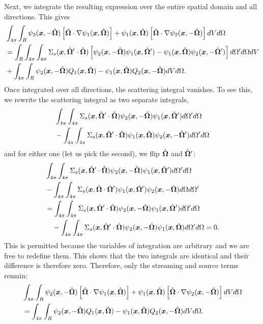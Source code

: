 Next, we integrate the resulting expression over the entire spatial domain and all directions. This gives
\begin{align}
  &\int_{4\pi} \int_R \psi_2(\bm{x},-\hat{\mathbf{\Omega}}) \left[ \hat{\mathbf{\Omega}} \cdot \nabla \psi_1(\bm{x},\hat{\mathbf{\Omega}}) \right] + \psi_1(\bm{x},\hat{\mathbf{\Omega}}) \left[ \hat{\mathbf{\Omega}} \cdot \nabla \psi_2(\bm{x},-\hat{\mathbf{\Omega}}) \right] dV d\Omega \nonumber \\*
  &= \int_R \int_{4\pi} \int_{4\pi} \Sigma_s(\bm{x},\hat{\mathbf{\Omega}}' \cdot \hat{\mathbf{\Omega}}) \left[ \psi_2(\bm{x},-\hat{\mathbf{\Omega}})  \psi_1(\bm{x},\hat{\mathbf{\Omega}}') -  \psi_1(\bm{x},\hat{\mathbf{\Omega}}) \psi_2(\bm{x},-\hat{\mathbf{\Omega}}') \right] d\Omega' d\Omega dV  \nonumber \\*
  &+ \int_{4\pi} \int_R  \psi_2(\bm{x},-\hat{\mathbf{\Omega}}) Q_1(\bm{x},\hat{\mathbf{\Omega}}) - \psi_1(\bm{x},\hat{\mathbf{\Omega}}) Q_2(\bm{x},-\hat{\mathbf{\Omega}}) dV d\Omega.
\end{align}
Once integrated over all directions, the scattering integral vanishes. To see this, we rewrite the scattering integral as two separate integrals,
\begin{align}
  &\int_{4\pi} \int_{4\pi} \Sigma_s(\bm{x},\hat{\mathbf{\Omega}}' \cdot \hat{\mathbf{\Omega}}) \psi_2(\bm{x},-\hat{\mathbf{\Omega}})  \psi_1(\bm{x},\hat{\mathbf{\Omega}}')  d\Omega' d\Omega \nonumber \\*
  &- \int_{4\pi} \int_{4\pi} \Sigma_s(\bm{x},\hat{\mathbf{\Omega}}' \cdot \hat{\mathbf{\Omega}}) \psi_1(\bm{x},\hat{\mathbf{\Omega}}) \psi_2(\bm{x},-\hat{\mathbf{\Omega}}') d\Omega' d\Omega \nonumber
\end{align}
and for either one (let us pick the second), we flip $\hat{\mathbf{\Omega}}$ and $\hat{\mathbf{\Omega}}'$:
\begin{align}
  &\int_{4\pi} \int_{4\pi} \Sigma_s(\bm{x},\hat{\mathbf{\Omega}}' \cdot \hat{\mathbf{\Omega}}) \psi_2(\bm{x},-\hat{\mathbf{\Omega}})  \psi_1(\bm{x},\hat{\mathbf{\Omega}}')  d\Omega' d\Omega  \nonumber \\*
  &- \int_{4\pi} \int_{4\pi} \Sigma_s(\bm{x},\hat{\mathbf{\Omega}} \cdot \hat{\mathbf{\Omega}}')  \psi_1(\bm{x},\hat{\mathbf{\Omega}}') \psi_2(\bm{x},-\hat{\mathbf{\Omega}}) d\Omega d\Omega'  \nonumber \\*
  &=\int_{4\pi} \int_{4\pi} \Sigma_s(\bm{x},\hat{\mathbf{\Omega}}' \cdot \hat{\mathbf{\Omega}}) \psi_2(\bm{x},-\hat{\mathbf{\Omega}})  \psi_1(\bm{x},\hat{\mathbf{\Omega}}')  d\Omega' d\Omega \nonumber \\*
  &\quad - \int_{4\pi} \int_{4\pi} \Sigma_s(\bm{x},\hat{\mathbf{\Omega}}' \cdot \hat{\mathbf{\Omega}})  \psi_2(\bm{x},-\hat{\mathbf{\Omega}}) \psi_1(\bm{x},\hat{\mathbf{\Omega}}) d\Omega' d\Omega = 0.  \nonumber 
\end{align}
This is permitted because the variables of integration are arbitrary and we are free to redefine them. This shows that the two integrals are identical and their difference is therefore zero. Therefore, only the streaming and source terms remain:
\begin{align}
  &\int_{4\pi} \int_R \psi_2(\bm{x},-\hat{\mathbf{\Omega}}) \left[ \hat{\mathbf{\Omega}} \cdot \nabla \psi_1(\bm{x},\hat{\mathbf{\Omega}}) \right] + \psi_1(\bm{x},\hat{\mathbf{\Omega}}) \left[ \hat{\mathbf{\Omega}} \cdot \nabla \psi_2(\bm{x},-\hat{\mathbf{\Omega}}) \right] dV d\Omega \nonumber \\*
  &= \int_{4\pi} \int_R  \psi_2(\bm{x},-\hat{\mathbf{\Omega}}) Q_1(\bm{x},\hat{\mathbf{\Omega}}) - \psi_1(\bm{x},\hat{\mathbf{\Omega}}) Q_2(\bm{x},-\hat{\mathbf{\Omega}}) dV d\Omega.
\end{align}

